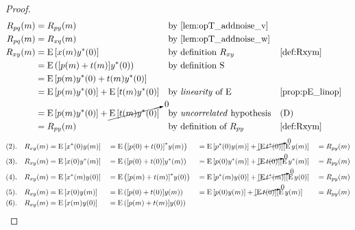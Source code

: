 \\
\begin{proof}
\begin{align*}
  \Rpq(m)
    &= \Rpy(m)
    && \text{by \prefp{lem:opT_addnoise_v}}
  \\
  \Rpq(m)
    &= \Rxq(m)
    && \text{by \prefp{lem:opT_addnoise_w}}
  \\
  \Rxy(m)
    &\eqd \pE\brs{\rvx(m)\rvy^\ast(0)}
    && \text{by definition $\Rxy$}
    && \text{\xref{def:Rxym}}
  \\&\eqd \pE\brp{\brs{\rvp(m)+\rvw(m)}\rvy^\ast(0)}
    && \text{by definition $\opS$}
  \\&= \pE\brs{\rvp(m)\rvy^\ast(0)+\rvw(m)\rvy^\ast(0)}
  \\&= \pE\brs{\rvp(m)\rvy^\ast(0)} + \pE\brs{\rvw(m)\rvy^\ast(0)}
    && \text{by \prope{linearity} of $\pE$}
    && \text{\xref{prop:pE_linop}}
  \\&= \pE\brs{\rvp(m)\rvy^\ast(0)} + \cancelto{0}{\pE\brs{\rvw(m)\rvy^\ast(0)}}
    && \text{by \prope{uncorrelated} hypothesis}
    && \text{(D)}
  \\&= \Rpy(m)
    && \text{by definition of $\Rpy$}
    && \text{\xref{def:Rxym}}
\end{align*}
\begin{align*}
    (2).\quad\Rxy(m)
       &\eqd \pE\brs{\rvx^\ast(0) \rvy(m)}
      &&\eqd \pE\brp{\brs{\rvp(0)+\rvw(0)}^\ast\rvy(m)}
      &&=    \pE\brs{     \rvp^\ast(0)\rvy(m)} + \cancelto{0}{\brs{\pE\rvw^\ast(0)}} \brs{\pE\rvy(m)}
      &&= \Rpy(m)
     \\
    (3).\quad\Rxy(m)
       &\eqd \pE\brs{\rvx(0)\rvy^\ast(m)}
      &&\eqd \pE\brp{\brs{\rvp(0)+\rvw(0)}     \rvy^\ast(m)}
      &&=    \pE\brs{     \rvp(0)\rvy^\ast(m)} + \cancelto{0}{\brs{\pE\rvw(0)}} \brs{\pE\rvy^\ast(m)}
      &&= \Rpy(m)
     \\
    (4).\quad\Rxy(m)
       &\eqd \pE\brs{\rvx^\ast(m)\rvy(0)}
      &&\eqd \pE\brp{\brs{\rvp(m)+\rvw(m)}^\ast\rvy(0)}
      &&=    \pE\brs{     \rvp^\ast(m)\rvy(0)} + \cancelto{0}{\brs{\pE\rvw^\ast(m)}} \brs{\pE\rvy(0)}
      &&= \Rpy(m)
     \\
    (5).\quad\Rxy(m)
       &\eqd \pE\brs{\rvx(0)\rvy(m)}
      &&\eqd \pE\brp{\brs{\rvp(0)+\rvw(0)}     \rvy(m)}
      &&=    \pE\brs{     \rvp(0)\rvy(m)} + \cancelto{0}{\brs{\pE\rvw(0)}} \brs{\pE\rvy(m)}
      &&= \Rpy(m)
     \\
    (6).\quad\Rxy(m)
       &\eqd \pE\brs{\rvx(m)\rvy(0)}
      &&\eqd \pE\brp{\brs{\rvp(m)+\rvw(m)}\rvy(0)}

\end{align*}
\end{proof}
